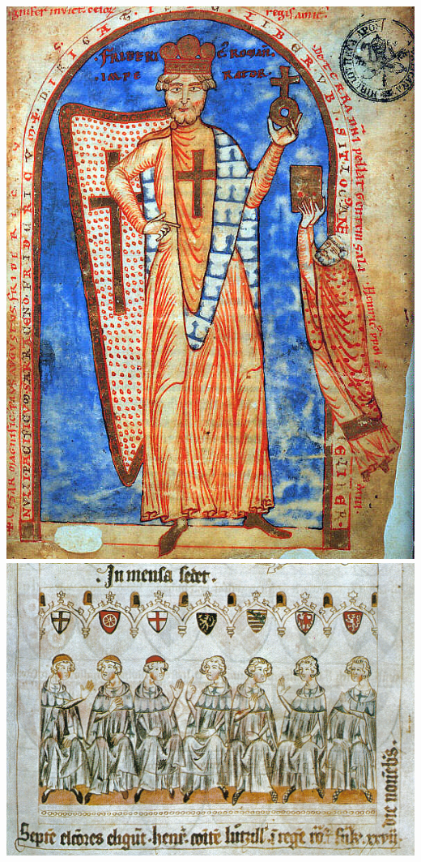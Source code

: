 \documentclass{article}
\begin{document}
\noindent\begin{minipage}{0.3\textwidth}
    \includegraphics[width=\linewidth]{barbarossa.jpg}
    \vspace{1em}
    \includegraphics[width=\linewidth]{kurfirti.jpg}
\end{minipage}
\end{document}
